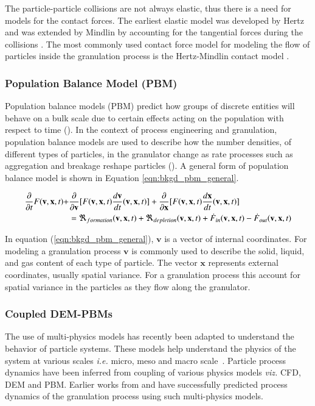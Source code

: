 \documentclass[preprint,11pt,authoryear]{elsarticle}
\begin{document}
The particle-particle collisions are not always elastic, thus there is a need for models for the 
contact forces. The earliest elastic model was developed by Hertz and was extended by Mindlin 
by accounting for the  tangential forces during the collisions \citep{adams2000}. The most commonly used contact 
force model for modeling the flow of particles inside the granulation process 
is the Hertz-Mindlin contact model \citep{gantt2006}\citep{hassanpour2013}. 
 

\subsubsection{Population Balance Model (PBM)}
     Population balance models (PBM) predict how groups of discrete entities will behave on a 
    bulk scale due to certain effects acting on the population with respect to time 
    (\cite{ramkrishna2014}). In the context of process engineering and granulation, population 
    balance models are used to describe how the number densities, of different types of particles, in 
    the granulator change as rate processes such as aggregation and breakage reshape particles 
    (\cite{Barrasso2013}). A general form of population balance model is shown in Equation 
    \ref{eqn:bkgd_pbm_general}.
    
    \begin{align}
    \frac{ \partial}{\partial t}F(\textbf{v},\textbf{x},t) +& \frac{\partial}{\partial 
        \textbf{v}}[F(\textbf{v},\textbf{x},t)\frac{d\textbf{v}}{dt}(\textbf{v},\textbf{x},t)] + 
    \frac{\partial}{\partial \textbf{x}}[F(\textbf{v},\textbf{x},t)\frac{d\textbf{x}}{dt}(\textbf{v},\textbf{x},t)] 
    \notag\\
    &= 
    \Re_{formation}(\textbf{v},\textbf{x},t)+\Re_{depletion}(\textbf{v},\textbf{x},t)+\dot{F}_{in}(\textbf{v},
    \textbf{x},t)-\dot{F}_{out}(\textbf{v},\textbf{x},t)
    \label{eqn:bkgd_pbm_general} 
    \end{align}
    
In equation (\ref{eqn:bkgd_pbm_general}), $\textbf{v}$ is a vector of internal coordinates. For 
modeling a granulation process $\textbf{v}$ is commonly used to describe the solid, liquid, and gas 
content of each type of particle. The vector $\textbf{x}$ represents external coordinates, usually 
spatial variance. For a granulation process this  account for spatial variance in the particles as they 
flow along the granulator.

\subsubsection{Coupled DEM-PBMs}
The use of multi-physics models has recently been adapted to understand the behavior of 
particle systems. These models help understand the physics of the system at various scales 
\textit{i.e.} micro, meso and macro scale~\citep{sen2014}. Particle process dynamics have been 
inferred from coupling of various physics models \textit{viz.} CFD, 
DEM and PBM. Earlier works from \cite{sen2014} and \cite{Barrasso2015cerd} have successfully 
predicted process dynamics of the granulation process using such multi-physics models.
\end{document}
